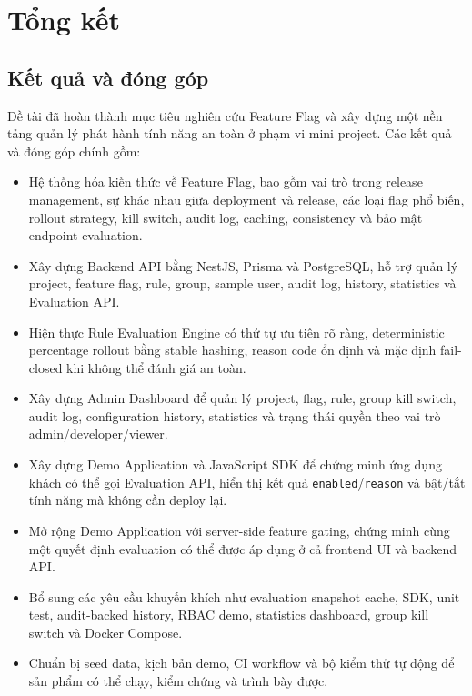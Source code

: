 \section{Tổng kết}

\subsection{Kết quả và đóng góp}

Đề tài đã hoàn thành mục tiêu nghiên cứu Feature Flag và xây dựng một nền tảng quản lý phát hành tính năng an toàn ở phạm vi mini project. Các kết quả và đóng góp chính gồm:

\begin{itemize}
    \item Hệ thống hóa kiến thức về Feature Flag, bao gồm vai trò trong release management, sự khác nhau giữa deployment và release, các loại flag phổ biến, rollout strategy, kill switch, audit log, caching, consistency và bảo mật endpoint evaluation.
    \item Xây dựng Backend API bằng NestJS, Prisma và PostgreSQL, hỗ trợ quản lý project, feature flag, rule, group, sample user, audit log, history, statistics và Evaluation API.
    \item Hiện thực Rule Evaluation Engine có thứ tự ưu tiên rõ ràng, deterministic percentage rollout bằng stable hashing, reason code ổn định và mặc định fail-closed khi không thể đánh giá an toàn.
    \item Xây dựng Admin Dashboard để quản lý project, flag, rule, group kill switch, audit log, configuration history, statistics và trạng thái quyền theo vai trò admin/developer/viewer.
    \item Xây dựng Demo Application và JavaScript SDK để chứng minh ứng dụng khách có thể gọi Evaluation API, hiển thị kết quả \texttt{enabled}/\texttt{reason} và bật/tắt tính năng mà không cần deploy lại.
    \item Mở rộng Demo Application với server-side feature gating, chứng minh cùng một quyết định evaluation có thể được áp dụng ở cả frontend UI và backend API.
    \item Bổ sung các yêu cầu khuyến khích như evaluation snapshot cache, SDK, unit test, audit-backed history, RBAC demo, statistics dashboard, group kill switch và Docker Compose.
    \item Chuẩn bị seed data, kịch bản demo, CI workflow và bộ kiểm thử tự động để sản phẩm có thể chạy, kiểm chứng và trình bày được.
\end{itemize}

